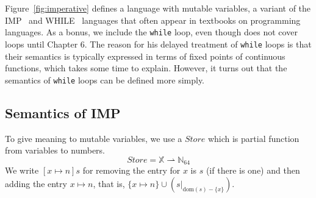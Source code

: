 \documentclass{tufte-handout}
\newcommand{\pto}[0]{\rightharpoonup}
\newcommand{\FNAT}[0]{\mathbb{N}_{64}}
\newcommand{\VAR}[0]{\mathbb{X}}
\newcommand{\STORE}[0]{\mathit{Store}}
\begin{document}

Figure~\ref{fig:imperative} defines a language with mutable variables,
a variant of the
IMP~\citep{Plotkin:1983aa,Winskel:1993uq,Amadio:1998fk} and
WHILE~\citep{Hoare:1969kw} languages that often appear in textbooks on
programming languages. As a bonus, we include the \texttt{while} loop,
even though \citet{Schmidt:1986vn} does not cover loops until Chapter
6. The reason for his delayed treatment of \texttt{while} loops is
that their semantics is typically expressed in terms of fixed points
of continuous functions, which takes some time to explain. However, it
turns out that the semantics of \texttt{while} loops can be defined
more simply.

\subsection{Semantics of IMP}

To give meaning to mutable variables, we use a $\STORE$ which
is partial function from variables to numbers.
\[
  \STORE = \VAR \pto \FNAT
\]
We write $[x\mapsto n]s$ for removing the entry for $x$ is $s$
(if there is one) and then adding the entry $x\mapsto n$,
that is, $\{x\mapsto n\} \cup (s|_{\mathrm{dom}(s)-\{x\}})$.
\end{document}
